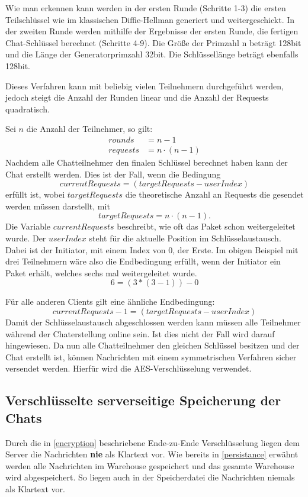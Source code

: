 Wie man erkennen kann werden in der ersten Runde (Schritte 1-3) die ersten Teilschlüssel wie im klassischen Diffie-Hellman generiert und weitergeschickt.
In der zweiten Runde werden mithilfe der Ergebnisse der ersten Runde, die fertigen Chat-Schlüssel berechnet (Schritte 4-9).
Die Größe der Primzahl n beträgt 128bit und die Länge der Generatorprimzahl 32bit. Die Schlüssellänge beträgt ebenfalls 128bit.

Dieses Verfahren kann mit beliebig vielen Teilnehmern durchgeführt werden, 
jedoch steigt die Anzahl der Runden linear und die Anzahl der Requests quadratisch.

Sei $n$ die Anzahl der Teilnehmer, so gilt:
\[
\begin{split}
  rounds &= n - 1\\
  requests &= n \cdot (n - 1)  
\end{split}
\]
Nachdem alle Chatteilnehmer den finalen Schlüssel berechnet haben kann der Chat erstellt werden. Dies ist der Fall,
wenn die Bedingung $$ currentRequests = (targetRequests - userIndex) $$ erfüllt ist, wobei $targetRequests$ die theoretische Anzahl
an Requests die gesendet werden müssen darstellt, mit $$targetRequests = n \cdot (n-1).$$
Die Variable $currentRequests$ beschreibt, wie oft das Paket schon weitergeleitet wurde.
Der $userIndex$ steht für die aktuelle Position im Schlüsselaustausch. Dabei ist der Initiator, mit einem Index von 0, der Erste.
Im obigen Beispiel mit drei Teilnehmern wäre also die Endbedingung erfüllt, wenn der Initiator ein Paket erhält, 
welches sechs mal weitergeleitet wurde.
$$ 6 = (3 * (3 - 1)) - 0 $$



Für alle anderen Clients gilt eine ähnliche Endbedingung: $$ currentRequests - 1 = (targetRequests - userIndex) $$
Damit der Schlüsselaustausch abgeschlossen werden kann müssen alle Teilnehmer während der Chaterstellung online sein. Ist dies nicht der Fall wird darauf hingewiesen.
Da nun alle Chatteilnehmer den gleichen Schlüssel besitzen und der Chat erstellt ist, können Nachrichten mit 
einem symmetrischen Verfahren sicher versendet werden. Hierfür wird die AES-Verschlüsselung verwendet.

\author{Troy Keßler}
\subsection{Verschlüsselte serverseitige Speicherung der Chats}
Durch die in \ref{encryption} beschriebene Ende-zu-Ende Verschlüsselung liegen dem Server die Nachrichten \textbf{nie} als Klartext vor.
Wie bereits in \ref{persistance} erwähnt werden alle Nachrichten im Warehouse gespeichert und das gesamte Warehouse wird abgespeichert.
So liegen auch in der Speicherdatei die Nachrichten niemals als Klartext vor.
